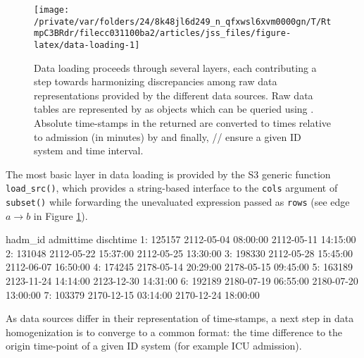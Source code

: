 \documentclass[
  notitle,
  nojss,
  noheadings]{jss}
\begin{document}
\begin{CodeChunk}
\begin{figure}

{\centering \texttt{[image: /private/var/folders/24/8k48jl6d249\_n\_qfxwsl6xvm0000gn/T/RtmpC3BRdr/filecc031100ba2/articles/jss\_files/figure-latex/data-loading-1]} 

}

\caption{Data loading proceeds through several layers, each contributing a step towards harmonizing discrepancies among raw data representations provided by the different data sources. Raw data tables are represented by  as  objects which can be queried using . Absolute time-stamps in the returned  are converted to times relative to admission (in minutes) by  and finally, /\allowbreak{}/\allowbreak{} ensure a given ID system and time interval.}\label{fig:data-loading}
\end{figure}
\end{CodeChunk}

The most basic layer in data loading is provided by the S3 generic
function \texttt{load\_src()}, which provides a string-based interface
to the \texttt{cols} argument of \texttt{subset()} while forwarding the
unevaluated expression passed as \texttt{rows} (see edge \(a \to b\) in
Figure \ref{fig:data-loading}).

\begin{CodeChunk}
\begin{CodeOutput}
   hadm_id           admittime           dischtime
1:  125157 2112-05-04 08:00:00 2112-05-11 14:15:00
2:  131048 2112-05-22 15:37:00 2112-05-25 13:30:00
3:  198330 2112-05-28 15:45:00 2112-06-07 16:50:00
4:  174245 2178-05-14 20:29:00 2178-05-15 09:45:00
5:  163189 2123-11-24 14:14:00 2123-12-30 14:31:00
6:  192189 2180-07-19 06:55:00 2180-07-20 13:00:00
7:  103379 2170-12-15 03:14:00 2170-12-24 18:00:00
\end{CodeOutput}
\end{CodeChunk}

As data sources differ in their representation of time-stamps, a next
step in data homogenization is to converge to a common format: the time
difference to the origin time-point of a given ID system (for example
ICU admission).
\end{document}
